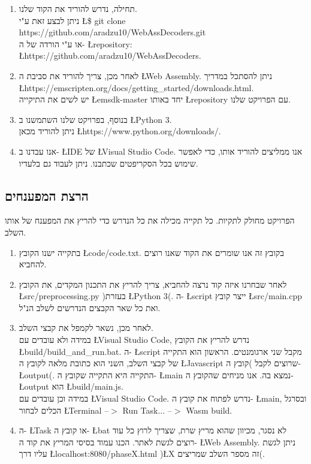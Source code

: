 \documentclass{article}
\begin{document}
	
	\begin{enumerate}
		\item 
		תחילה, נדרש להוריד את הקוד שלנו. \\
		ניתן לבצע זאת ע"י 	
		\L{\$ git clone https://github.com/aradzu10/WebAssDecoders.git} \\
		או ע"י הורדה של ה- 
		\L{repository}: 
		\L{https://github.com/aradzu10/WebAssDecoders}. 
		\item 
		לאחר מכן, צריך להוריד את סביבת ה 
		\L{Web Assembly}. 
		ניתן להסתכל במדריך \\
		\L{https://emscripten.org/docs/getting\_started/downloads.html}. \\
		יש לשים את התיקייה  
		\L{emsdk-master} 
		יחד באותו 
		\L{repository}
		עם הפרויקט שלנו. 
		\item 
		בנוסף, בפרויקט שלנו השתמשנו ב
		\L{Python 3}. \\
		ניתן להוריד מכאן 
		\L{https://www.python.org/downloads/}.
		\item 
		אנו עבדנו ב-
		\L{IDE} 
		של 
		\L{Visual Studio Code}. 
		אנו ממליצים להוריד אותו, כדי לאפשר שימוש בכל הסקריפטים שכתבנו. 
		ניתן לעבוד גם בלעדיו. 		
	\end{enumerate} 
	
	\subsection{הרצת המפענחים}
	הפרויקט מחולק לתקיות. כל תקייה מכילה את כל הנדרש כדי להריץ את המפענח של אותו השלב. 
	\begin{enumerate}
		\item 
		בתקייה ישנו הקובץ 
		\L{code/code.txt}. 
		בקובץ זה אנו שומרים את הקוד שאנו רוצים להחביא. 
		\item 
		לאחר שבחרנו איזה קוד נרצה להחביא, צריך להריץ את התכנון המקדים, 
		את הקובץ 
		\L{src/preprocessing.py} 
		)בעזרת 
		\L{Python 3}(. 
		ה- 
		\L{script} 
		ייצר קובץ 
		\L{src/main.cpp} 
		ואת כל שאר הקבצים הנדרשים לשלב הנ"ל. 
		\item 
		לאחר מכן, נשאר לקמפל את קבצי השלב. \\
		במידה ולא עובדים עם 
		\L{Visual Studio Code}, 
		נדרש להריץ את הקובץ 
		\L{build/build\_and\_run.bat}. 
		ה- 
		\L{script} 
		מקבל שני ארגומנטים. הראשון הוא התקייה של קבצי השלב, השני הוא כתובת מלאה לקובץ ה 
		\L{Javascript} 
		שרוצים לקבל )קובץ ה-
		\L{output}(. 
		התקייה היא התקייה שקובץ ה- 
		\L{main} 
		נמצא בה. 
		אנו מניחים שהקובץ ה- 
		\L{output} 
		הוא 
		\L{build/main.js}. \\
		במידה וכן עובדים עם 
		\L{Visual Studio Code}. 
		נדרש לפתוח את קובץ ה- 
		\L{main}, 
		ובסרגל הכלים לבחור 
		\L{Terminal --$>$ Run Task... --$>$ Wasm build}. 
		\item 
		ה- 
		\L{Task} 
		או קובץ ה- 
		\L{bat}
		לא נסגר, מכיוון שהוא מריץ שרת, שצריך לרוץ כל עוד רוצים לגשת לאתר. 
		הכנו עמוד בסיסי המריץ את קוד ה- 
		\L{Web Assembly}. 
		ניתן לגשת עליו דרך 
		\L{localhost:8080/phaseX.html} )\L{X} זה מספר השלב שמריצים(. 
	\end{enumerate}
	
\end{document}
